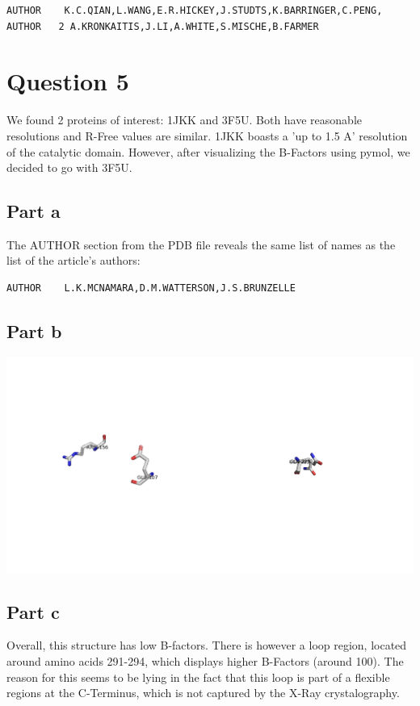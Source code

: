 \documentclass[11pt, a4paper,titlepage]{article}
\begin{document}
\begin{verbatim}
AUTHOR    K.C.QIAN,L.WANG,E.R.HICKEY,J.STUDTS,K.BARRINGER,C.PENG,               
AUTHOR   2 A.KRONKAITIS,J.LI,A.WHITE,S.MISCHE,B.FARMER         
\end{verbatim}
 
\section{Question 5}
We found 2 proteins of interest: 1JKK and 3F5U. Both have reasonable
resolutions and R-Free values are similar. 1JKK boasts a 'up to 1.5 A'
resolution of the catalytic domain. However, after visualizing the
B-Factors using pymol, we decided to go with 3F5U.

\subsection{Part a}
The AUTHOR section from the PDB file reveals the same list of names as
the list of the article's authors:

\begin{verbatim}
AUTHOR    L.K.MCNAMARA,D.M.WATTERSON,J.S.BRUNZELLE
\end{verbatim}

\subsection{Part b}
\includegraphics[width=15cm]{./Figures/5b.png}

\subsection{Part c}

Overall, this structure has low B-factors. There is however a loop
region, located around amino acids 291-294, which displays higher
B-Factors (around 100). The reason for this seems to be lying in the
fact that this loop is part of a flexible regions at the C-Terminus,
which is not captured by the X-Ray crystalography.
\end{document}
